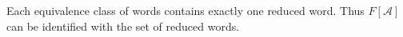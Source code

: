Each equivalence class of words contains exactly one reduced word. Thus $F[\mathcal{A}]$ can be identified with the set of reduced words.

